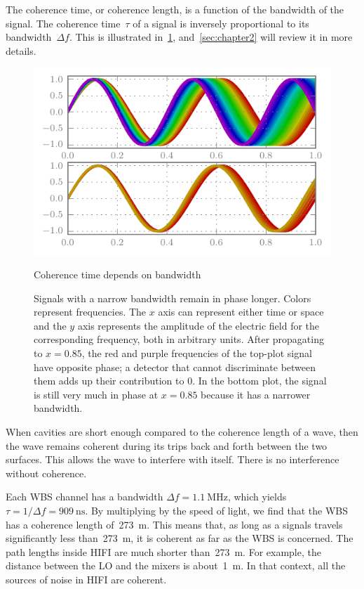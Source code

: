 The coherence time, or coherence length, is a function of the bandwidth of the signal.
The coherence time~$\tau$ of a signal is inversely proportional to its bandwidth~$\Delta f$.
This is illustrated in~\cref{fig:coherence}, and~\cref{sec:chapter2} will review it in more details.
\begin{figure}[hbtp]
    \centering
    \includegraphics[width=.8\textwidth]{coherence}
    \caption{Coherence time depends on bandwidth}
    \caption*{
        Signals with a narrow bandwidth remain in phase longer.
        Colors represent frequencies.
        The $x$ axis can represent either time or space and the $y$ axis represents the amplitude of the electric field for the corresponding frequency, both in arbitrary units.
        After propagating to $x=0.85$, the red and purple frequencies of the top-plot signal have opposite phase; a detector that cannot discriminate between them adds up their contribution to 0.
        In the bottom plot, the signal is still very much in phase at $x=0.85$
        because it has a narrower bandwidth.
    }
    \label{fig:coherence}
\end{figure}

When cavities are short enough compared to the coherence length of a wave, then the wave remains coherent during its trips back and forth between the two surfaces.
This allows the wave to interfere with itself.
There is no interference without coherence.

Each WBS channel has a bandwidth $\Delta f = \SI{1.1}{\mega\hertz}$,
which yields $\tau = 1 / \Delta f = \SI{909}{\nano\second}$.
By multiplying by the speed of light, we find that the WBS has a coherence length of~\SI{273}{\meter}.
This means that, as long as a signals travels significantly less than~\SI{273}{\meter}, it is coherent as far as the WBS is concerned.
The path lengths inside HIFI are much shorter than~\SI{273}{\meter}.
For example, the distance between the LO and the mixers is about~\SI{1}{\meter}.
In that context, all the sources of noise in HIFI are coherent.

